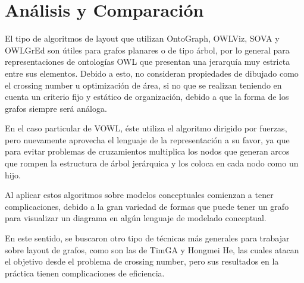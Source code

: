 
\section{Análisis y Comparación}
El tipo de algoritmos de layout que utilizan OntoGraph, OWLViz, SOVA y OWLGrEd son útiles para grafos planares o de tipo árbol, por lo general para representaciones de ontologías OWL que presentan una jerarquía muy estricta entre sus elementos. Debido a esto, no consideran propiedades de dibujado como el crossing number u optimización de área, si no que se realizan teniendo en cuenta un criterio fijo y estático de organización, debido a que la forma de los grafos siempre será análoga.

En el caso particular de VOWL, éste utiliza el algoritmo dirigido por fuerzas, pero nuevamente aprovecha el lenguaje de la representación a su favor, ya que para evitar problemas de cruzamientos multiplica los nodos que generan arcos que rompen la estructura de árbol jerárquica y los coloca en cada nodo como un hijo.

Al aplicar estos algoritmos sobre modelos conceptuales comienzan a tener complicaciones, debido a la gran variedad de formas que puede tener un grafo para visualizar un diagrama en algún lenguaje de modelado conceptual. 

En este sentido, se buscaron otro tipo de técnicas más generales para trabajar sobre layout de grafos, como son las de TimGA y Hongmei He, las cuales atacan el objetivo desde el problema de crossing number, pero sus resultados en la práctica tienen complicaciones de eficiencia.

